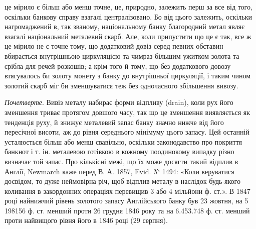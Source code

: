 \parcont{}  %
це мірило є більш або менш точне, це, природно, залежить перш за все від
того, оскільки банкову справу взагалі централізовано. Бо від цього залежить,
оскільки нагромаджений в, так званому, національному банку благородний метал
являє взагалі національний металевий скарб. Але, коли припустити що це є так,
все ж це мірило не є точне тому, що додатковий довіз серед певних обставин
вбирається внутрішньою циркуляцією та чимраз більшим ужитком золота та
срібла для речей розкошів; а крім того й тому, що без додаткового довозу
втягувалось би золоту монету з банку до внутрішньої циркуляції, і таким
чином золотий скарб міг би зменшуватися теж без одночасного збільшення вивозу.

\emph{Почетверте}. Вивіз металу набирає форми відпливу (drain), коли рух
його зменшення триває протягом довшого часу, так що це зменшення виявляється
як тенденція руху, й знижує металевий запас банку значно нижче від його пересічної
висоти, аж до рівня середнього мінімуму цього запасу. Цей останній усталюється
більш або менш свавільно, оскільки законодавство про покриття банкнот і т. ін.
металевою готівкою в кожному поодинокому випадку різно визначає той запас.
Про кількісні межі, що їх може досягти такий відплив в Англії, Newmarch
каже перед В. А. 1857, Evid. № 1494: «Коли керуватися досвідом, то дуже
неймовірна річ, щоб відплив металу в наслідок будь-якого коливання в закордонних
операціях перевищив 3 або 4 мільйони ф. ст.». В 1847 році найнижчий
рівень золотого запасу Англійського банку був 23 жовтня, на 5 198156 ф. ст.
менший проти 26 грудня 1846 року та на 6.453.748 ф. ст. менший проти найвищого
рівня його в 1846 році (29 серпня).

